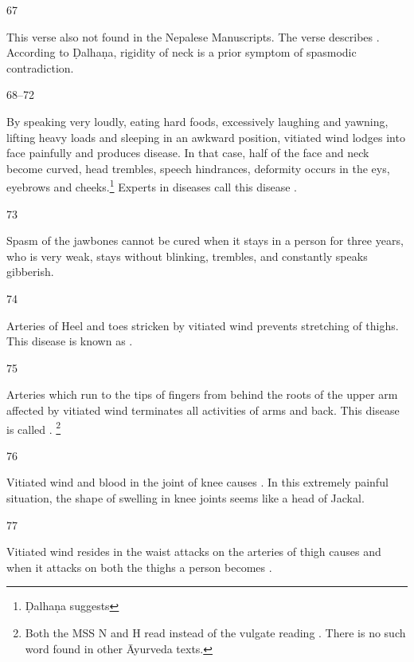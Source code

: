 \begin{translation}
\item[67]

	This verse also not found in the Nepalese Manuscripts. The verse
	describes . According to Ḍalhaṇa,
	rigidity of neck is a prior symptom of spasmodic contradiction. 

\item[68--72]

	By speaking very loudly, eating hard foods, excessively laughing and
	yawning, lifting heavy loads and sleeping in an awkward position,
	vitiated wind lodges into face painfully and produces
	 disease. In that case, half of
	the face and neck become curved, head trembles, speech hindrances,
	deformity occurs in the eys, eyebrows and cheeks.\footnote{Ḍalhaṇa
	suggests } Experts in
	diseases call this disease . 

\item[73]

	Spasm of the jawbones cannot be cured when it stays in a person for
	three years, who is very weak, stays without blinking, trembles, and
	constantly speaks gibberish.

\item[74]

	Arteries of Heel and toes stricken by vitiated wind prevents stretching
	of thighs. This disease is known as .

\item[75]

	Arteries which run to the tips of fingers from behind the roots of the
	upper arm affected by vitiated wind terminates all activities of arms
	and back.  This disease is called . \footnote{Both the MSS N and H read  instead of the
	vulgate reading . There is no such word found in other
	Āyurveda texts.}

\item[76]

	Vitiated wind and blood in the joint of knee causes
	. In this extremely painful
	situation, the shape of swelling in knee joints seems like a head of
	Jackal. 

\item[77]

	Vitiated wind resides in the waist attacks on the arteries of thigh
	causes  and when it attacks on both the thighs a
	person becomes .


\end{translation}
